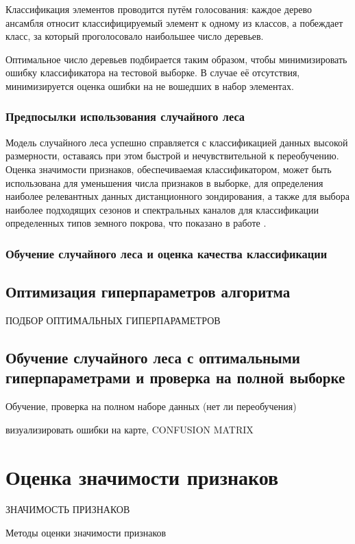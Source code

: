 \documentclass[14pt, a4paper, oneside]{extarticle}
\begin{document}
Классификация элементов проводится путём голосования: каждое дерево ансамбля относит классифицируемый элемент к одному из классов, а побеждает класс, за который проголосовало наибольшее число деревьев.

Оптимальное число деревьев подбирается таким образом, чтобы минимизировать ошибку классификатора на тестовой выборке. В случае её отсутствия, минимизируется оценка ошибки на не вошедших в набор элементах.

\subsubsection{Предпосылки использования случайного леса}
Модель случайного леса успешно справляется с классификацией данных высокой размерности, оставаясь при этом быстрой и нечувствительной к переобучению. Оценка значимости признаков, обеспечиваемая классификатором, может быть использована для уменьшения числа признаков в выборке, для определения наиболее релевантных данных дистанционного зондирования, а также для выбора наиболее подходящих сезонов и спектральных каналов для классификации определенных типов земного покрова, что показано в работе \cite{random-forest-in-remote-sensing}.

\subsubsection{Обучение случайного леса и оценка качества классификации}

\subsection{Оптимизация гиперпараметров алгоритма}
ПОДБОР ОПТИМАЛЬНЫХ ГИПЕРПАРАМЕТРОВ

\subsection{Обучение случайного леса с оптимальными гиперпараметрами и проверка на полной выборке}
Обучение, проверка на полном наборе данных (нет ли переобучения)

визуализировать ошибки на карте, CONFUSION MATRIX
\newpage

\section{Оценка значимости признаков}
ЗНАЧИМОСТЬ ПРИЗНАКОВ

Методы оценки значимости признаков
\end{document}
